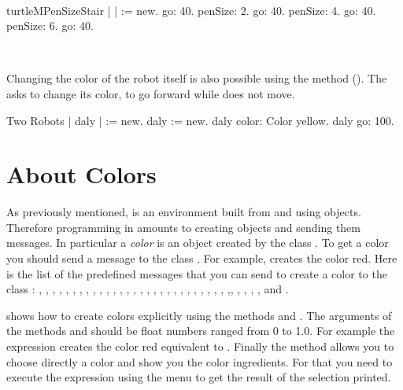 \ 


\begin{scriptfig}{turtleMPenSize}{Stair}\label{scr:Stair}
| \caro |
\caro := \Turtle new.
\caro go: 40.
\caro penSize: 2.
\caro go: 40.
\caro penSize: 4.
\caro go: 40.
\caro penSize: 6.
\caro go: 40.
\end{scriptfig}

\ 

Changing the color of the robot itself is also possible using the
method  (). The  asks  to change its color, to go forward while \caro does not move.

\begin{scriptwithtitle}{Two Robots}\label{scr:yellowturtle}
| \caro daly |
\caro := \Turtle new.
daly  := \Turtle new.
daly color: Color yellow.
daly go: 100.
\end{scriptwithtitle}

\section{About Colors}

As previously mentioned, \sq  is an environment built from and using objects. Therefore programming in \sq amounts to creating objects and sending them messages. In particular a \emph{color} is an object created by the class . To get a color you should send a message to the class . For example,  creates the color red. Here is the list of the predefined messages that you can send to create a color to the class : 
, , , , , , , , , , , , , , , , , , , , , , , , , , , ,  ,, , , , , and .

 shows how to create colors explicitly using the methods  and . The arguments of the methods  and  should be float numbers ranged from 0 to 1.0. For example the expression  creates the color red equivalent to .
Finally the method  allows you to choose directly a color and show you the color ingredients. For that you need to execute the expression  using the  menu to get the result of the selection printed.

